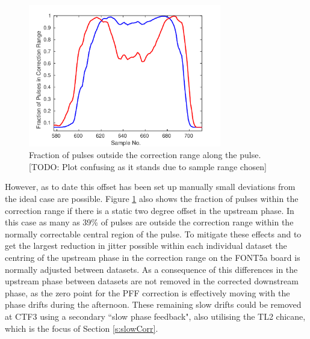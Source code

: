 \begin{figure}
  \centering
  \includegraphics[width=0.75\textwidth]{Figures/feedforward/longFF_fractInRange}
  \caption{Fraction of pulses outside the correction range along the pulse. [TODO: Plot confusing as it stands due to sample range chosen]}
  \label{f:longFF_fractInRange}
\end{figure}

However, as to date this offset has been set up manually small deviations from the ideal case are possible. Figure \ref{f:longFF_fractInRange} also shows the fraction of pulses within the correction range if there is a static two degree offset in the upstream phase. In this case as many as 39\% of pulses are outside the correction range within the normally correctable central region of the pulse. To mitigate these effects and to get the largest reduction in jitter possible within each individual dataset the centring of the upstream phase in the correction range on the FONT5a board is normally adjusted between datasets. As a consequence of this differences in the upstream phase between datasets are not removed in the corrected downstream phase, as the zero point for the PFF correction is effectively moving with the phase drifts during the afternoon. These remaining slow drifts could be removed at CTF3 using a secondary ``slow phase feedback", also utilising the TL2 chicane, which is the focus of Section \ref{s:slowCorr}.

